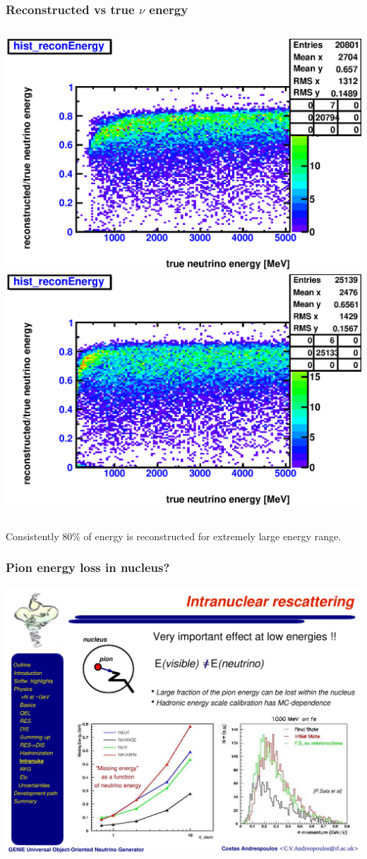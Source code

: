 \documentclass{beamer}
\begin{document}
\begin{frame}
	\frametitle{Reconstructed vs true $\nu$ energy}
	\begin{columns}[t]
		\includegraphics[width=1.0\textwidth]{nue_H1_reconVSTrueNuEnergy_onlyCC_maxR600cm.eps}
		\includegraphics[width=1.0\textwidth]{nue_C12_reconVSTrueNuEnergy_onlyCC_maxR600cm.eps}
	\end{columns}
	Consistently $80\%$ of energy is reconstructed for extremely large energy range.
\end{frame}

\begin{frame}
	\frametitle{Pion energy loss in nucleus?}
	\includegraphics[width=\textwidth]{genie_pi_energy_loss.pdf}
\end{frame}
\end{document}
